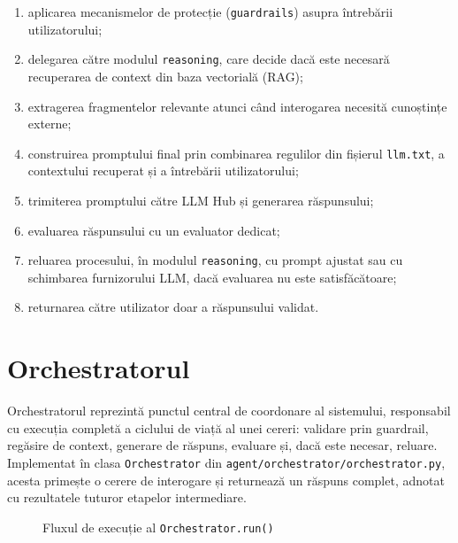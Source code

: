 \documentclass[12pt, a4paper, oneside, romanian]{teza-upb}
\begin{document}
\begin{enumerate}
    \item aplicarea mecanismelor de protecție (\texttt{guardrails}) asupra întrebării utilizatorului;
    \item delegarea către modulul \texttt{reasoning}, care decide dacă este necesară recuperarea de context din baza vectorială (RAG);
    \item extragerea fragmentelor relevante atunci când interogarea necesită cunoștințe externe;
    \item construirea promptului final prin combinarea regulilor din fișierul \texttt{llm.txt}, a contextului recuperat și a întrebării utilizatorului;
    \item trimiterea promptului către LLM Hub și generarea răspunsului;
    \item evaluarea răspunsului cu un evaluator dedicat;
    \item reluarea procesului, în modulul \texttt{reasoning}, cu prompt ajustat sau cu schimbarea furnizorului LLM, dacă evaluarea nu este satisfăcătoare;
    \item returnarea către utilizator doar a răspunsului validat.
\end{enumerate}


\section{Orchestratorul}

Orchestratorul reprezintă punctul central de coordonare al sistemului, responsabil cu execuția completă a ciclului de viață al unei cereri: validare prin guardrail, regăsire de context, generare de răspuns, evaluare și, dacă este necesar, reluare. Implementat în clasa \texttt{Orchestrator} din \texttt{agent/orchestrator/orchestrator.py}, acesta primește o cerere de interogare și returnează un răspuns complet, adnotat cu rezultatele tuturor etapelor intermediare.

\begin{figure}[H]
\centering
{}
\caption{Fluxul de execuție al \texttt{Orchestrator.run()}}
\label{fig:orchestrator}
\end{figure}
\end{document}
